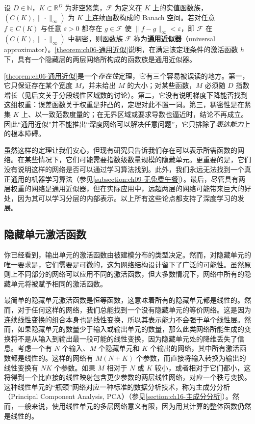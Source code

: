 \documentclass[../../main.tex]{subfiles}
\begin{document}
\begin{definition}[通用近似器]\label{definition:ch06-通用近似器}
设 $D\in\mathbb{N}$，$K\subset\mathbb{R}^{D}$ 为非空紧集，$\mathcal{F}$ 为定义在 $K$ 上的实值函数族，$(C(K),\|\cdot\|_{\infty})$ 为 $K$ 上连续函数构成的 Banach 空间。若对任意 $f\in C(K)$ 与任意 $\varepsilon>0$ 都存在 $g\in\mathcal{F}$ 使 $\|f-g\|_{\infty}<\varepsilon$，即 $\mathcal{F}$ 在 $(C(K),\|\cdot\|_{\infty})$ 中稠密，则函数族 $\mathcal{F}$ 称为\textbf{通用近似器}（universal approximator）。\cref{theorem:ch06-通用近似}说明，在满足该定理条件的激活函数 $h$ 下，具有一个隐藏层的两层网络所构成的函数族是通用近似器。
\end{definition}

\begin{remark}\cref{theorem:ch06-通用近似}是一个\emph{存在性}定理，它有三个容易被误读的地方。第一，它只保证存在某个宽度 $M$，并未给出 $M$ 的大小；对某些函数，$M$ 必须随 $D$ 指数增长（见后文关于分段线性区域数的讨论）。第二，它没有说明梯度下降能否找到这组权重：误差函数关于权重是非凸的，定理对此不置一词。第三，稠密性是在紧集 $K$ 上、以一致范数度量的；在无界区域或要求导数也逼近时，结论不再成立。因此“通用近似”并不能推出“深度网络可以解决任意问题”，它只排除了\emph{表达能力}上的根本障碍。
\end{remark}

虽然这样的定理让我们安心，但现有研究只告诉我们存在可以表示所需函数的网络。在某些情况下，它们可能需要指数级数量规模的隐藏单元。更重要的是，它们没有说明这样的网络是否可以通过学习算法找到。此外，我们永远无法找到一个真正通用的机器学习算法（参见\cref{subsection:ch09-无免费午餐}）。最后，尽管具有两层权重的网络是通用近似器，但在实际应用中，远超两层的网络可能带来巨大的好处，因为其可以学习分层的内部表示。以上所有这些论点都支持了深度学习的发展。

\subsection{隐藏单元激活函数}\label{subsection:ch06-隐藏单元激活函数}

你已经看到，输出单元的激活函数由被建模分布的类型决定。然而，对隐藏单元的唯一要求是，它们需要是可微的，这为网络结构设计留下了广泛的可能性。虽然原则上不同部分的网络可以应用不同的激活函数，但大多数情况下，网络中所有的隐藏单元将被赋予相同的激活函数。

最简单的隐藏单元激活函数是恒等函数，这意味着所有的隐藏单元都是线性的。然而，对于任何这样的网络，我们总能找到一个没有隐藏单元的等价网络。这是因为连续线性变换的组合本身也是线性变换，所以其表示能力不会强于单个线性层。然而，如果隐藏单元的数量少于输入或输出单元的数量，那么此类网络所能生成的变换将不是从输入到输出最一般可能的线性变换，因为隐藏单元处的降维丢失了信息。考虑一个有 $N$ 个输入、$M$ 个隐藏单元和 $K$ 个输出的网络，其中所有激活函数都是线性的。这样的网络有 $M(N+K)$ 个参数，而直接将输入转换为输出的线性变换有 $NK$ 个参数。如果 $M$ 相对于 $N$ 或 $K$ 较小，或者相对于它们都小，这将得到一个比直接的线性映射包含更少参数的两层线性网络，对应一个秩亏变换。这种线性单元的“瓶颈”网络对应一种标准的数据分析技术，称为主成分分析（Principal Component Analysis, PCA）（参见\cref{section:ch16-主成分分析}）。然而，一般来说，使用线性单元的多层网络意义有限，因为用其计算的整体函数仍然是线性的。
\end{document}
